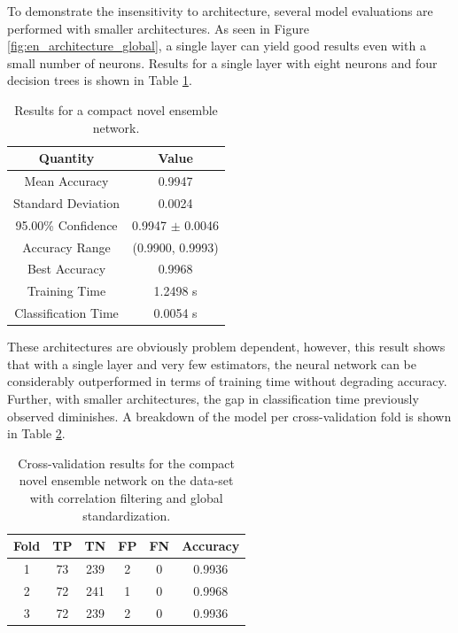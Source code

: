 \documentclass[paper=a4, fontsize=11pt]{scrartcl} %
\begin{document}
To demonstrate the insensitivity to architecture, several model evaluations are performed with smaller architectures.
As seen in Figure \ref{fig:en_architecture_global}, a single layer can yield good results even with a small number of neurons.
Results for a single layer with eight neurons and four decision trees is shown in Table \ref{tab: novel compact}.

\begin{table}[H]
	\centering
	\caption{Results for a compact novel ensemble network.}
	\begin{tabular}{|c||c|}
		\hline
		\textbf{Quantity} & \textbf{Value} \\ \hline \hline
		Mean Accuracy        & 0.9947 \\ \hline
		Standard Deviation   & 0.0024 \\ \hline
		95.00\% Confidence   & 0.9947 $\pm$ 0.0046 \\ \hline
		Accuracy Range       & (0.9900, 0.9993) \\ \hline
		Best Accuracy        & 0.9968 \\ \hline
		Training Time        & 1.2498 s\\ \hline
		Classification Time  & 0.0054 s \\ \hline
	\end{tabular}
	\label{tab: novel compact}
\end{table}

These architectures are obviously problem dependent, however, this result shows that with a single layer and very few estimators, the neural network can be considerably outperformed in terms of training time without degrading accuracy.
Further, with smaller architectures, the gap in classification time previously observed diminishes.
A breakdown of the model per cross-validation fold is shown in Table \ref{tab: cv compact novel}.
\begin{table}[H]
	\centering
	\caption{Cross-validation results for the compact novel ensemble network on the data-set with correlation filtering and global standardization.}
	\begin{tabular}{|c|c|c|c|c|c|}
		\hline
		\textbf{Fold} & \textbf{TP} & \textbf{TN} & \textbf{FP} & \textbf{FN} & \textbf{Accuracy} \\ \hline \hline
		1 & 73 & 239 & 2 & 0 & 0.9936  \\ \hline
		2 & 72 & 241 & 1 & 0 & 0.9968  \\ \hline
		3 & 72 & 239 & 2 & 0 & 0.9936  \\ \hline
	\end{tabular}
	\label{tab: cv compact novel}
\end{table}
\end{document}
